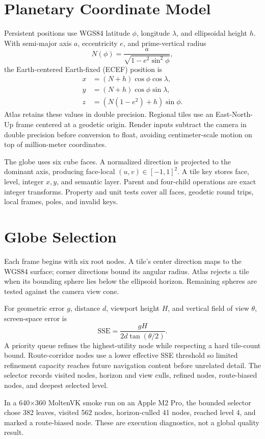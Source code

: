 \documentclass[12pt]{article}
\begin{document}
\section{Planetary Coordinate Model}
Persistent positions use WGS84 latitude $\phi$, longitude $\lambda$, and ellipsoidal height $h$.
With semi-major axis $a$, eccentricity $e$, and prime-vertical radius
\[
N(\phi)=\frac{a}{\sqrt{1-e^2\sin^2\phi}},
\]
the Earth-centered Earth-fixed (ECEF) position is
\begin{align}
x&=(N+h)\cos\phi\cos\lambda,\\
y&=(N+h)\cos\phi\sin\lambda,\\
z&=(N(1-e^2)+h)\sin\phi.
\end{align}
Atlas retains these values in double precision. Regional tiles use an East-North-Up frame centered
at a geodetic origin. Render inputs subtract the camera in double precision before conversion to
float, avoiding centimeter-scale motion on top of million-meter coordinates.

The globe uses six cube faces. A normalized direction is projected to the dominant axis, producing
face-local $(u,v)\in[-1,1]^2$. A tile key stores face, level, integer $x,y$, and semantic layer.
Parent and four-child operations are exact integer transforms. Property and unit tests cover all
faces, geodetic round trips, local frames, poles, and invalid keys.

\section{Globe Selection}
Each frame begins with six root nodes. A tile's center direction maps to the WGS84 surface; corner
directions bound its angular radius. Atlas rejects a tile when its bounding sphere lies below the
ellipsoid horizon. Remaining spheres are tested against the camera view cone.

For geometric error $g$, distance $d$, viewport height $H$, and vertical field of view $\theta$,
screen-space error is
\[
\mathrm{SSE}=\frac{gH}{2d\tan(\theta/2)}.
\]
A priority queue refines the highest-utility node while respecting a hard tile-count bound.
Route-corridor nodes use a lower effective SSE threshold so limited refinement capacity reaches
future navigation content before unrelated detail. The selector records visited nodes, horizon and
view culls, refined nodes, route-biased nodes, and deepest selected level.

In a 640$\times$360 MoltenVK smoke run on an Apple M2 Pro, the bounded selector chose 382 leaves,
visited 562 nodes, horizon-culled 41 nodes, reached level 4, and marked a route-biased node. These
are execution diagnostics, not a global quality result.
\end{document}
